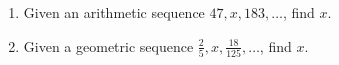 \documentclass[12pt, twoside]{article}
\begin{document}
\begin{enumerate}[itemsep=1.5cm]
    \item Given an arithmetic sequence $47, x, 183, \dots$, find $x$. \vspace{1cm}

    \item Given a geometric sequence $\displaystyle \frac{2}{5}, x, \frac{18}{125}, \dots$, find $x$.
\end{enumerate}
\end{document}
